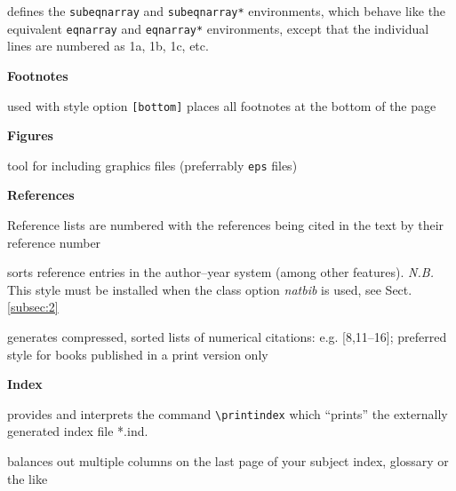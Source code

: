 \documentclass[graybox,square]{svmono}
\begin{document}
\begin{sloppy}
\begin{description}
\item[\texttt{subeqnarray.sty}] defines the \texttt{subeqnarray} and \texttt{subeqnarray*} environments, which behave like the equivalent \texttt{eqnarray} and \texttt{eqnarray*} environments, except that the individual
lines are numbered as 1a, 1b, 1c, etc.
\end{description}


\textbf{Footnotes}

\begin{description}
\item[\texttt{footmisc.sty}] used with style option \texttt{[bottom]} places all footnotes at
the bottom of the page
\end{description}



\textbf{Figures}

\begin{description}
\item[\texttt{graphicx.sty}] tool for including graphics files (preferrably \texttt{eps} files)
\end{description}


\textbf{References}

\begin{description}
\item[\textit{default}] Reference lists are numbered with the references being
cited in the text by their reference number
\item[\texttt{natbib.sty}] sorts reference entries in the author--year system (among
other features). \textit{N.B.} This style must be installed when
the class option \textit{natbib} is used, see Sect. \ref{subsec:2}
\item[\texttt{cite.sty}] generates compressed, sorted lists of numerical citations:
e.g. [8,11--16]; preferred style for books published in a print version only
\end{description}


\textbf{Index}

\begin{description}
\item[\texttt{makeidx.sty}] provides and interprets the command \verb|\printindex|
which ``prints'' the externally generated index file *.ind.
\item[\texttt{multicol.sty}] balances out multiple columns on the last page of your
subject index, glossary or the like
\end{description}



\end{sloppy}
\end{document}
